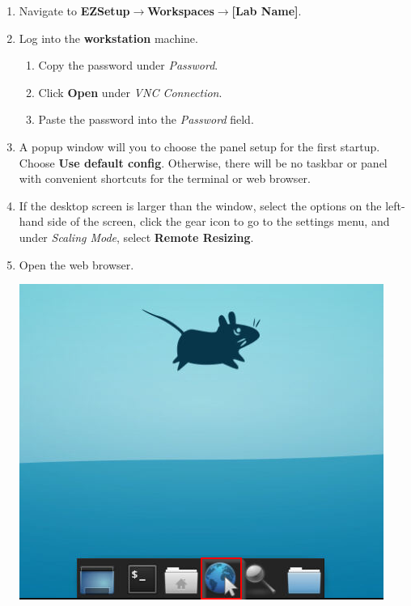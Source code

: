 \documentclass[letterpaper, 12pt]{article}
\begin{document}
\begin{enumerate}
    \item Navigate to \textbf{EZSetup$\rightarrow$Workspaces$\rightarrow$[Lab Name]}.
    
    \item Log into the \textbf{workstation} machine.
    \begin{enumerate}
        \item Copy the password under \textit{Password}.
        \item Click \textbf{Open} under \textit{VNC Connection}.
        \item Paste the password into the \textit{Password} field.
    \end{enumerate}

    \item A popup window will you to choose the panel setup for the first startup. Choose \textbf{Use default config}.
    Otherwise, there will be no taskbar or panel with convenient shortcuts for the terminal or web browser.

    \item If the desktop screen is larger than the window, select the options on the left-hand side of the screen,
    click the gear icon to go to the settings menu, and under \textit{Scaling Mode}, select \textbf{Remote Resizing}.

    \item Open the web browser.

    \begin{center}
    \includegraphics[scale=0.75]{images/part1/step5.png}
    \end{center}


\end{enumerate}
\end{document}
